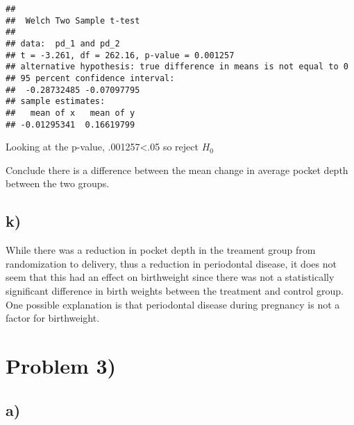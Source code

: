 \documentclass[]{article}
\newenvironment{Shaded}{\begin{snugshade}}{\end{snugshade}}
\newcommand{\KeywordTok}[1]{\textcolor[rgb]{0.13,0.29,0.53}{\textbf{#1}}}
\newcommand{\DataTypeTok}[1]{\textcolor[rgb]{0.13,0.29,0.53}{#1}}
\newcommand{\DecValTok}[1]{\textcolor[rgb]{0.00,0.00,0.81}{#1}}
\newcommand{\StringTok}[1]{\textcolor[rgb]{0.31,0.60,0.02}{#1}}
\newcommand{\OperatorTok}[1]{\textcolor[rgb]{0.81,0.36,0.00}{\textbf{#1}}}
\newcommand{\NormalTok}[1]{#1}
\begin{document}
\begin{verbatim}
## 
##  Welch Two Sample t-test
## 
## data:  pd_1 and pd_2
## t = -3.261, df = 262.16, p-value = 0.001257
## alternative hypothesis: true difference in means is not equal to 0
## 95 percent confidence interval:
##  -0.28732485 -0.07097795
## sample estimates:
##   mean of x   mean of y 
## -0.01295341  0.16619799
\end{verbatim}

Looking at the p-value, .001257\textless{}.05 so reject \(H_0\)

Conclude there is a difference between the mean change in average pocket
depth between the two groups.

\subsection{k)}\label{k}

While there was a reduction in pocket depth in the treament group from
randomization to delivery, thus a reduction in periodontal disease, it
does not seem that this had an effect on birthweight since there was not
a statistically significant difference in birth weights between the
treatment and control group. One possible explanation is that
periodontal disease during pregnancy is not a factor for birthweight.

\section{Problem 3)}\label{problem-3}

\subsection{a)}\label{a-1}

\begin{Shaded}
\end{Shaded}
\end{document}

